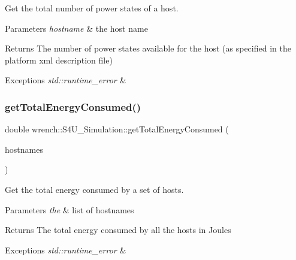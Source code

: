Get the total number of power states of a host. 


\begin{DoxyParams}{Parameters}
{\em hostname} & the host name \\
\hline
\end{DoxyParams}
\begin{DoxyReturn}{Returns}
The number of power states available for the host (as specified in the platform xml description file) 
\end{DoxyReturn}

\begin{DoxyExceptions}{Exceptions}
{\em std\+::runtime\+\_\+error} & \\
\hline
\end{DoxyExceptions}
\mbox{\label{classwrench_1_1_s4_u___simulation_a159cc9630614cf8143e5131c3d38a2ed}} 
\subsubsection{\texorpdfstring{get\+Total\+Energy\+Consumed()}{getTotalEnergyConsumed()}}
{\footnotesize\ttfamily double wrench\+::\+S4\+U\+\_\+\+Simulation\+::get\+Total\+Energy\+Consumed (\begin{DoxyParamCaption}\item[{const std\+::vector$<$ std\+::string $>$ \&}]{hostnames }\end{DoxyParamCaption})\hspace{0.3cm}{\ttfamily [static]}}



Get the total energy consumed by a set of hosts. 


\begin{DoxyParams}{Parameters}
{\em the} & list of hostnames \\
\hline
\end{DoxyParams}
\begin{DoxyReturn}{Returns}
The total energy consumed by all the hosts in Joules 
\end{DoxyReturn}

\begin{DoxyExceptions}{Exceptions}
{\em std\+::runtime\+\_\+error} & \\
\hline
\end{DoxyExceptions}
\mbox{\label{classwrench_1_1_s4_u___simulation_a64a1b7d70b4b0b5965b304d379b4a19d}} 
